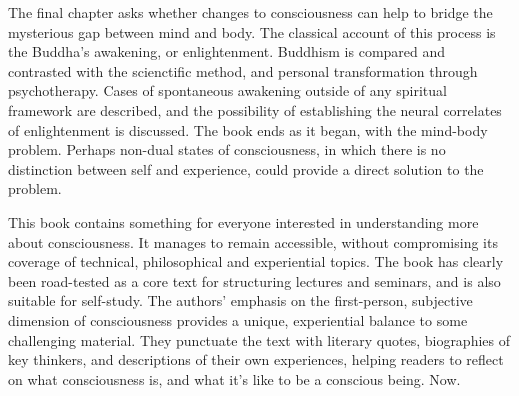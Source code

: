 \documentclass[a4paper]{article}
\begin{document}
The final chapter asks whether changes to consciousness can help to bridge the
mysterious gap between mind and body. The classical account of this process is
the Buddha's awakening, or enlightenment. Buddhism is compared and contrasted
with the scienctific method, and personal transformation through
psychotherapy. Cases of spontaneous awakening outside of any spiritual
framework are described, and the possibility of establishing the neural
correlates of enlightenment is discussed. The book ends as it began, with the
mind-body problem. Perhaps non-dual states of consciousness, in which there is
no distinction between self and experience, could provide a direct solution to
the problem.

This book contains something for everyone interested in understanding more
about consciousness. It manages to remain accessible, without compromising its
coverage of technical, philosophical and experiential topics. The book has
clearly been road-tested as a core text for structuring lectures and seminars,
and is also suitable for self-study. The authors' emphasis on the
first-person, subjective dimension of consciousness provides a unique,
experiential balance to some challenging material. They punctuate the text
with literary quotes, biographies of key thinkers, and descriptions of their
own experiences, helping readers to reflect on what consciousness is, and what
it’s like to be a conscious being. Now.
\end{document}
